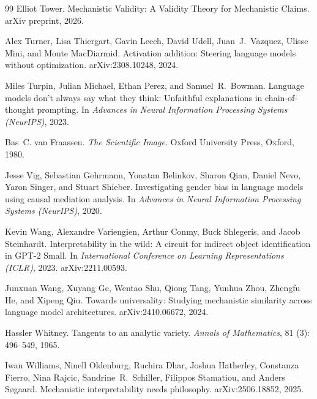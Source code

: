\documentclass{article}
\begin{document}
\begin{thebibliography}{99}
Elliot Tower.
\newblock Mechanistic Validity: A Validity Theory for Mechanistic Claims.
\newblock arXiv preprint, 2026.

Alex Turner, Lisa Thiergart, Gavin Leech, David Udell, Juan~J.\ Vazquez,
  Ulisse Mini, and Monte MacDiarmid.
\newblock Activation addition: Steering language models without optimization.
\newblock arXiv:2308.10248, 2024.

Miles Turpin, Julian Michael, Ethan Perez, and Samuel~R.\ Bowman.
\newblock Language models don't always say what they think: Unfaithful
  explanations in chain-of-thought prompting.
\newblock In \emph{Advances in Neural Information Processing Systems (NeurIPS)}, 2023.

Bas~C. van Fraassen.
\newblock \emph{The Scientific Image}.
\newblock Oxford University Press, Oxford, 1980.

Jesse Vig, Sebastian Gehrmann, Yonatan Belinkov, Sharon Qian, Daniel Nevo,
  Yaron Singer, and Stuart Shieber.
\newblock Investigating gender bias in language models using causal mediation
  analysis.
\newblock In \emph{Advances in Neural Information Processing Systems (NeurIPS)}, 2020.

Kevin Wang, Alexandre Variengien, Arthur Conmy, Buck Shlegeris, and Jacob
  Steinhardt.
\newblock Interpretability in the wild: A circuit for indirect object
  identification in {GPT-2 Small}.
\newblock In \emph{International Conference on Learning Representations
  (ICLR)}, 2023.
\newblock arXiv:2211.00593.

Junxuan Wang, Xuyang Ge, Wentao Shu, Qiong Tang, Yunhua Zhou, Zhengfu He, and
  Xipeng Qiu.
\newblock Towards universality: Studying mechanistic similarity across language
  model architectures.
\newblock arXiv:2410.06672, 2024.

Hassler Whitney.
\newblock Tangents to an analytic variety.
\newblock \emph{Annals of Mathematics}, 81 (3): 496--549, 1965.

Iwan Williams, Ninell Oldenburg, Ruchira Dhar, Joshua Hatherley, Constanza
  Fierro, Nina Rajcic, Sandrine~R.\ Schiller, Filippos Stamatiou, and Anders
  S{\o}gaard.
\newblock Mechanistic interpretability needs philosophy.
\newblock arXiv:2506.18852, 2025.


\end{thebibliography}
\end{document}
